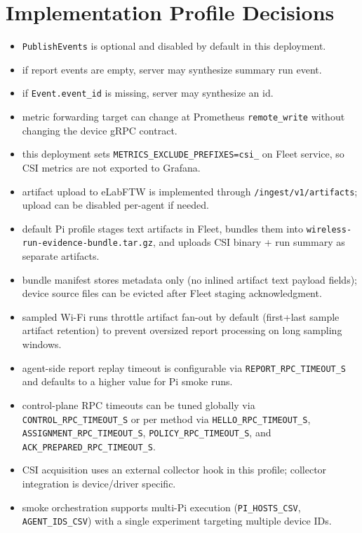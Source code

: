 \documentclass[11pt,a4paper]{article}
\begin{document}
\section{Implementation Profile Decisions}
\begin{itemize}
  \item \texttt{PublishEvents} is optional and disabled by default in this deployment.
  \item if report events are empty, server may synthesize summary run event.
  \item if \texttt{Event.event\_id} is missing, server may synthesize an id.
  \item metric forwarding target can change at Prometheus \texttt{remote\_write} without changing the device gRPC contract.
  \item this deployment sets \texttt{METRICS\_EXCLUDE\_PREFIXES=csi\_} on Fleet service, so CSI metrics are not exported to Grafana.
  \item artifact upload to eLabFTW is implemented through \texttt{/ingest/v1/artifacts}; upload can be disabled per-agent if needed.
  \item default Pi profile stages text artifacts in Fleet, bundles them into \texttt{wireless-run-evidence-bundle.tar.gz}, and uploads CSI binary + run summary as separate artifacts.
  \item bundle manifest stores metadata only (no inlined artifact text payload fields); device source files can be evicted after Fleet staging acknowledgment.
  \item sampled Wi-Fi runs throttle artifact fan-out by default (first+last sample artifact retention) to prevent oversized report processing on long sampling windows.
  \item agent-side report replay timeout is configurable via \texttt{REPORT\_RPC\_TIMEOUT\_S} and defaults to a higher value for Pi smoke runs.
  \item control-plane RPC timeouts can be tuned globally via \texttt{CONTROL\_RPC\_TIMEOUT\_S} or per method via \texttt{HELLO\_RPC\_TIMEOUT\_S}, \texttt{ASSIGNMENT\_RPC\_TIMEOUT\_S}, \texttt{POLICY\_RPC\_TIMEOUT\_S}, and \texttt{ACK\_PREPARED\_RPC\_TIMEOUT\_S}.
  \item CSI acquisition uses an external collector hook in this profile; collector integration is device/driver specific.
  \item smoke orchestration supports multi-Pi execution (\texttt{PI\_HOSTS\_CSV}, \texttt{AGENT\_IDS\_CSV}) with a single experiment targeting multiple device IDs.

\end{itemize}
\end{document}
